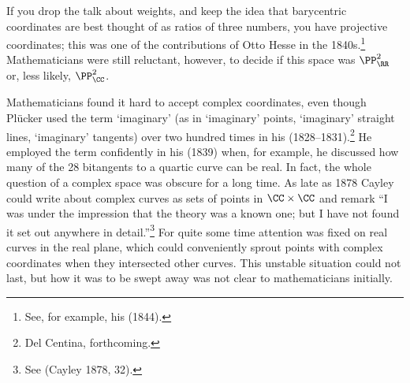 If you drop the talk about weights, and keep the idea that barycentric coordinates are best thought of as ratios of three numbers, you have projective coordinates; this was one of the contributions of Otto Hesse in the 1840s.\footnote{See, for example, his (1844).}
Mathematicians were still reluctant, however, to decide if this space was $\PP_\RR^2$ or, less likely, $\PP_{\CC}^2$. 
 


Mathematicians found it  hard to accept complex coordinates,  even though Pl\"ucker used the term `imaginary'  (as in `imaginary' points, `imaginary' straight lines, `imaginary' tangents) over two hundred times in his   (1828--1831).\footnote{Del Centina, forthcoming.} He employed the term confidently in his (1839) when, for example, he discussed how many of the 28 bitangents to a quartic curve can be real. In fact, the whole question of a complex space was obscure for a long time. As late as 1878 Cayley could write about complex curves as sets of points in $\CC \times \CC$ and remark ``I was under the impression that the theory was a known one; but I have not found it set out anywhere in detail.''\footnote{See (Cayley 1878, 32).} For quite some time attention was fixed on real curves in the real plane, which could conveniently sprout points with complex coordinates when they intersected other curves. This unstable situation could not last, but how it was to be swept away was not clear to mathematicians initially. 


